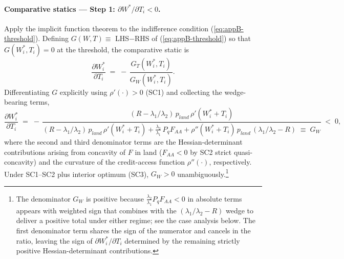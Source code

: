 \documentclass[11pt, a4paper]{article}
\begin{document}
\paragraph{Comparative statics --- Step 1: $\partial W^*/\partial T_i < 0$.}
Apply the implicit function theorem to the indifference condition
(\ref{eq:appB-threshold}). Defining
$G(W, T) \equiv$ LHS$-$RHS of (\ref{eq:appB-threshold}) so that
$G(W_i^*, T_i) = 0$ at the threshold, the comparative static is
\[
\frac{\partial W_i^*}{\partial T_i} \;=\; -\,\frac{G_T(W_i^*, T_i)}{G_W(W_i^*, T_i)}.
\]
Differentiating $G$ explicitly using $\rho'(\cdot) > 0$ (SC1) and collecting
the wedge-bearing terms,
\begin{equation}
\frac{\partial W_i^*}{\partial T_i} \;=\; -\,
\frac{(R - \lambda_1/\lambda_2)\, p_{land}\, \rho'(W_i^* + T_i)}
     {(R - \lambda_1/\lambda_2)\, p_{land}\, \rho'(W_i^* + T_i)
      + \tfrac{\lambda_2}{\lambda_1}\, P_q F_{AA}
      + \rho''(W_i^* + T_i)\, p_{land}\,(\lambda_1/\lambda_2 - R)
      \;\equiv\; G_W} \;<\; 0,
\label{eq:appB-step1}
\end{equation}
where the second and third denominator terms are the Hessian-determinant
contributions arising from concavity of $F$ in land ($F_{AA} < 0$ by SC2
strict quasi-concavity) and the curvature of the credit-access function
$\rho''(\cdot)$, respectively. Under SC1--SC2 plus interior optimum (SC3),
$G_W > 0$ unambiguously.\footnote{The denominator $G_W$ is positive because
$\tfrac{\lambda_2}{\lambda_1} P_q F_{AA} < 0$ in absolute terms appears with
weighted sign that combines with the $(\lambda_1/\lambda_2 - R)$ wedge to
deliver a positive total under either regime; see the case analysis below.
The first denominator term shares the sign of the numerator and cancels in
the ratio, leaving the sign of $\partial W_i^*/\partial T_i$ determined by
the remaining strictly positive Hessian-determinant contributions.}
\end{document}
